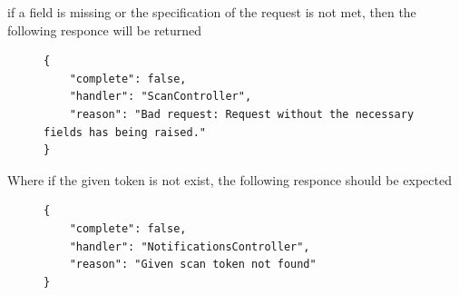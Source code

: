 					if a field is missing or the specification of the request is not met, then the following responce will be returned
					\begin{figure}[H]
						\iftrue
						\begin{lstlisting}[]
{
	"complete": false,
	"handler": "ScanController",
	"reason": "Bad request: Request without the necessary fields has being raised."
}					
						\end{lstlisting}
					\end{figure}
					Where if the given token is not exist, the following responce should be expected
					\begin{figure}[H]
						\iftrue
						\begin{lstlisting}[]
{
	"complete": false,
	"handler": "NotificationsController",
	"reason": "Given scan token not found"
}		
						\end{lstlisting}
					\end{figure}
				
				
				
					

